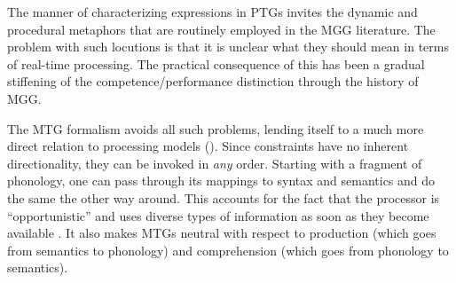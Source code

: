 \documentclass[output=paper,hidelinks]{langscibook}
\begin{document}
%
%
%
%
%


The manner of characterizing expressions in PTGs invites the dynamic and procedural metaphors that are routinely employed in the MGG literature. The problem with such locutions is that it is unclear what they should mean in terms of real-time processing. The practical consequence of this has been a gradual stiffening of the competence/performance distinction through the history of MGG. %


The MTG formalism avoids all such problems, lending itself to a much more direct relation to processing models (\citealt{sag2011performance, jackendoff2007parallel, jackendoff2011what}).  Since constraints have no inherent directionality, they can be invoked in \textit{any} order. Starting with a fragment of phonology, one can pass through its mappings to syntax and semantics and do the same the other way around. This accounts for the fact that the processor is ``opportunistic'' and uses diverse types of information as soon as they become available \citep{acuna2016opportunistic}. It also makes MTGs neutral with respect to production (which goes from semantics to phonology) and comprehension (which goes from phonology to semantics).%
\end{document}

